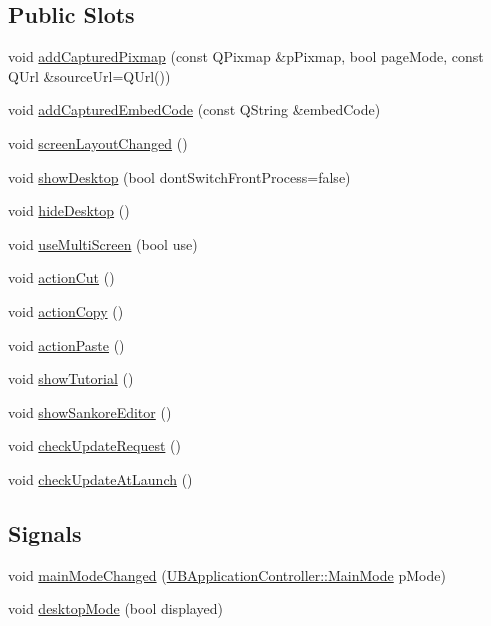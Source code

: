 \subsection*{Public Slots}
\begin{DoxyCompactItemize}
\item 
void \hyperlink{class_u_b_application_controller_a17f6c4d2a5043b97c4cd307f1e3bde49}{add\-Captured\-Pixmap} (const Q\-Pixmap \&p\-Pixmap, bool page\-Mode, const Q\-Url \&source\-Url=Q\-Url())
\item 
void \hyperlink{class_u_b_application_controller_a23f7be573c67d3229e02f15ef915f226}{add\-Captured\-Embed\-Code} (const Q\-String \&embed\-Code)
\item 
void \hyperlink{class_u_b_application_controller_a72e23efbc98ad6be861a48630cafdccb}{screen\-Layout\-Changed} ()
\item 
void \hyperlink{class_u_b_application_controller_a37672e9bd2905eaa55f41d8919209c7f}{show\-Desktop} (bool dont\-Switch\-Front\-Process=false)
\item 
void \hyperlink{class_u_b_application_controller_a59f95b747443497d344b8af0fd231cf4}{hide\-Desktop} ()
\item 
void \hyperlink{class_u_b_application_controller_a089c1fdb84300e0cfbe0cd1035a44f28}{use\-Multi\-Screen} (bool use)
\item 
void \hyperlink{class_u_b_application_controller_a3def02974385510d3173e6f2d4fc9332}{action\-Cut} ()
\item 
void \hyperlink{class_u_b_application_controller_a8f2c3d6040b3d7ad8723aeb9f618d86a}{action\-Copy} ()
\item 
void \hyperlink{class_u_b_application_controller_a6afa41e1bc0c178acaa89684b7e9db26}{action\-Paste} ()
\item 
void \hyperlink{class_u_b_application_controller_a404caf4ccafd3a2afef1ef6b3d67ce30}{show\-Tutorial} ()
\item 
void \hyperlink{class_u_b_application_controller_a71f94a70bea749313f269373716b97c7}{show\-Sankore\-Editor} ()
\item 
void \hyperlink{class_u_b_application_controller_a189da6fbf3cbd7b4e2c39081dd83a8fe}{check\-Update\-Request} ()
\item 
void \hyperlink{class_u_b_application_controller_a0bfdfc3f99a22f458d462d38f2e1a587}{check\-Update\-At\-Launch} ()
\end{DoxyCompactItemize}
\subsection*{Signals}
\begin{DoxyCompactItemize}
\item 
void \hyperlink{class_u_b_application_controller_a7fe4743de7290ede4e5bd297698e764d}{main\-Mode\-Changed} (\hyperlink{class_u_b_application_controller_a72ac04dd6883ac94b53e8e1dcdf2af39}{U\-B\-Application\-Controller\-::\-Main\-Mode} p\-Mode)
\item 
void \hyperlink{class_u_b_application_controller_a8c07de1fd2def173a0a2ea7071621025}{desktop\-Mode} (bool displayed)
\end{DoxyCompactItemize}
